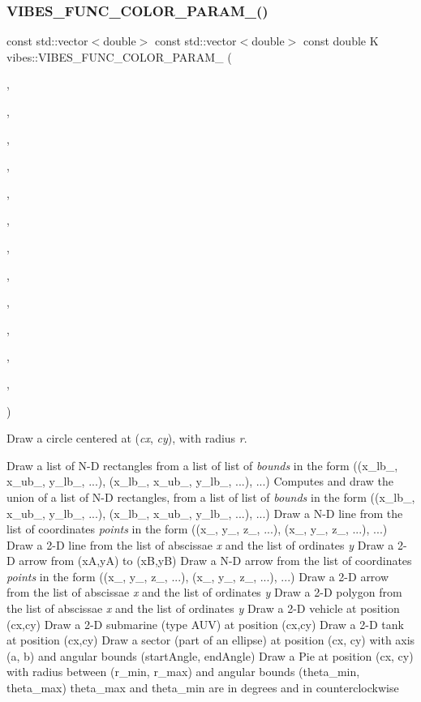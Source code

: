 \subsubsection{\texorpdfstring{V\+I\+B\+E\+S\+\_\+\+F\+U\+N\+C\+\_\+\+C\+O\+L\+O\+R\+\_\+\+P\+A\+R\+A\+M\+\_()}{VIBES\_FUNC\_COLOR\_PARAM\_6()}\hspace{0.1cm}{\footnotesize\ttfamily [2/2]}}
{\footnotesize\ttfamily const std\+::vector$<$double$>$ const std\+::vector$<$double$>$ const double K vibes\+::\+V\+I\+B\+E\+S\+\_\+\+F\+U\+N\+C\+\_\+\+C\+O\+L\+O\+R\+\_\+\+P\+A\+R\+A\+M\+\_ (\begin{DoxyParamCaption}\item[{draw\+Sector}]{,  }\item[{const double \&}]{,  }\item[{cx}]{,  }\item[{const double \&}]{,  }\item[{cy}]{,  }\item[{const double \&}]{,  }\item[{a}]{,  }\item[{const double \&}]{,  }\item[{b}]{,  }\item[{const double \&}]{,  }\item[{start\+Angle}]{,  }\item[{const double \&}]{,  }\item[{end\+Angle}]{ }\end{DoxyParamCaption})}



Draw a circle centered at ({\itshape cx}, {\itshape cy}), with radius {\itshape r}. 

Draw a list of N-\/D rectangles from a list of list of {\itshape bounds} in the form ((x\+\_\+lb\+\_, x\+\_\+ub\+\_, y\+\_\+lb\+\_, ...), (x\+\_\+lb\+\_, x\+\_\+ub\+\_, y\+\_\+lb\+\_, ...), ...) Computes and draw the union of a list of N-\/D rectangles, from a list of list of {\itshape bounds} in the form ((x\+\_\+lb\+\_, x\+\_\+ub\+\_, y\+\_\+lb\+\_, ...), (x\+\_\+lb\+\_, x\+\_\+ub\+\_, y\+\_\+lb\+\_, ...), ...) Draw a N-\/D line from the list of coordinates {\itshape points} in the form ((x\+\_, y\+\_, z\+\_, ...), (x\+\_, y\+\_, z\+\_, ...), ...) Draw a 2-\/D line from the list of abscissae {\itshape x} and the list of ordinates {\itshape y} Draw a 2-\/D arrow from (xA,yA) to (xB,yB) Draw a N-\/D arrow from the list of coordinates {\itshape points} in the form ((x\+\_, y\+\_, z\+\_, ...), (x\+\_, y\+\_, z\+\_, ...), ...) Draw a 2-\/D arrow from the list of abscissae {\itshape x} and the list of ordinates {\itshape y} Draw a 2-\/D polygon from the list of abscissae {\itshape x} and the list of ordinates {\itshape y} Draw a 2-\/D vehicle at position (cx,cy) Draw a 2-\/D submarine (type A\+UV) at position (cx,cy) Draw a 2-\/D tank at position (cx,cy) Draw a sector (part of an ellipse) at position (cx, cy) with axis (a, b) and angular bounds (start\+Angle, end\+Angle) Draw a Pie at position (cx, cy) with radius between (r\+\_\+min, r\+\_\+max) and angular bounds (theta\+\_\+min, theta\+\_\+max) theta\+\_\+max and theta\+\_\+min are in degrees and in counterclockwise 